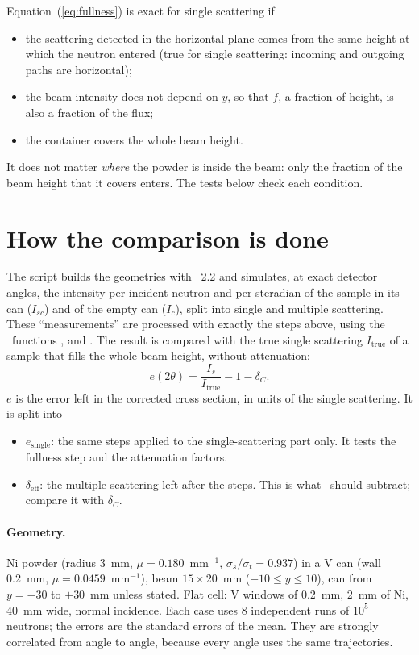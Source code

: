 \documentclass[11pt,a4paper]{report}
\begin{document}
Equation~(\ref{eq:fullness}) is exact for single scattering if
\begin{itemize}
  \item the scattering detected in the horizontal plane comes from the same
        height at which the neutron entered (true for single scattering:
        incoming and outgoing paths are horizontal);
  \item the beam intensity does not depend on $y$, so that $f$, a fraction of
        height, is also a fraction of the flux;
  \item the container covers the whole beam height.
\end{itemize}
It does not matter \emph{where} the powder is inside the beam: only the fraction
of the beam height that it covers enters. The tests below check each condition.

\section{How the comparison is done}

The script  builds the geometries with
\mcams~2.2 and simulates, at exact detector angles, the intensity per incident
neutron and per steradian of the sample in its can ($I_{sc}$) and of the empty
can ($I_c$), split into single and multiple scattering. These ``measurements''
are processed with exactly the steps above, using the \pyc\ functions
,  and . The result is compared with the true
single scattering $I_\mathrm{true}$ of a sample that fills the whole beam height,
without attenuation:
\begin{equation}
  e(2\theta) = \frac{I_s}{I_\mathrm{true}} - 1 - \delta_C .
\end{equation}
$e$ is the error left in the corrected cross section, in units of the single
scattering. It is split into
\begin{itemize}
  \item $e_\mathrm{single}$: the same steps applied to the single-scattering
        part only. It tests the fullness step and the attenuation factors.
  \item $\delta_\mathrm{eff}$: the multiple scattering left after the steps.
        This is what \cor\ should subtract; compare it with $\delta_C$.
\end{itemize}

\paragraph{Geometry.} Ni powder (radius 3~mm, $\mu = 0.180$~mm$^{-1}$,
$\sigma_s/\sigma_t = 0.937$) in a V can (wall 0.2~mm, $\mu =
0.0459$~mm$^{-1}$), beam $15 \times 20$~mm ($-10 \le y \le 10$), can from
$y=-30$ to $+30$~mm unless stated. Flat cell: V windows of 0.2~mm, 2~mm of Ni,
40~mm wide, normal incidence. Each case uses 8 independent runs of $10^5$
neutrons; the errors are the standard errors of the mean. They are strongly
correlated from angle to angle, because every angle uses the same trajectories.
\end{document}
